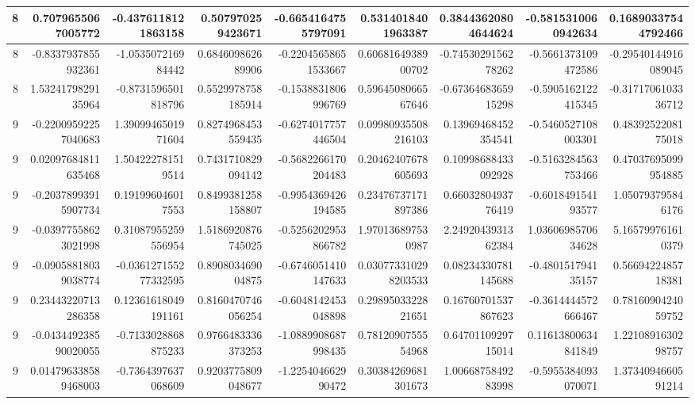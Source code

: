 \documentclass{jlreq}
\numberwithin{equation}{section}
\begin{document}
\begin{table}[H]
{\begin{tabular}{|r|r|r|r|r|r|r|r|r|}
      8 & 0.7079655067005772    & -0.4376118121863158   & 0.507970259423671    & -0.6654164755797091  & 0.5314018401963387    & 0.38443620804644624   & -0.5815310060942634   & 0.16890337544792466   \\ \hline
      8 & -0.8337937855932361   & -1.053507216984442    & 0.684609862689906    & -0.22045658651533667 & 0.6068164938900702    & -0.7453029156278262   & -0.5661373109472586   & -0.29540144916089045  \\ \hline
      8 & 1.5324179829135964    & -0.8731596501818796   & 0.5529978758185914   & -0.1538831806996769  & 0.5964508066567646    & -0.6736468365915298   & -0.5905162122415345   & -0.3171706103336712   \\ \hline
      9 & -0.22009592257040683  & 1.3909946501971604    & 0.8274968453559435   & -0.6274017757446504  & 0.09980935508216103   & 0.13969468452354541   & -0.5460527108003301   & 0.4839252208175018    \\ \hline
      9 & 0.02097684811635468   & 1.504222781519514     & 0.7431710829094142   & -0.5682266170204483  & 0.20462407678605693   & 0.10998688433092928   & -0.5163284563753466   & 0.47037695099954885   \\ \hline
      9 & -0.20378993915907734  & 0.191996046017553     & 0.8499381258158807   & -0.9954369426194585  & 0.23476737171897386   & 0.6603280493776419    & -0.601849154193577    & 1.050793795846176     \\ \hline
      9 & -0.03977558623021998  & 0.31087955259556954   & 1.5186920876745025   & -0.5256202953866782  & 1.970136897530987     & 2.2492043931362384    & 1.0360698570634628    & 5.165799761610379     \\ \hline
      9 & -0.09058818039038774  & -0.036127155277332595 & 0.890803469004875    & -0.6746051410147633  & 0.030773310298203533  & 0.08234330781145688   & -0.480151794135157    & 0.5669422485718381    \\ \hline
      9 & 0.23443220713286358   & 0.12361618049191161   & 0.8160470746056254   & -0.6048142453048898  & 0.2989503322821651    & 0.16760701537867623   & -0.3614444572666467   & 0.7816090424059752    \\ \hline
      9 & -0.043449238590020055 & -0.7133028868875233   & 0.9766483336373253   & -1.0889908687998435  & 0.7812090755554968    & 0.6470110929715014    & 0.11613800634841849   & 1.2210891630298757    \\ \hline
      9 & 0.014796338589468003  & -0.7364397637068609   & 0.9203775809048677   & -1.225404662990472   & 0.30384269681301673   & 1.0066875849283998    & -0.5955384093070071   & 1.3734094660591214    \\ \hline

\end{tabular}}
\end{table}
\end{document}
